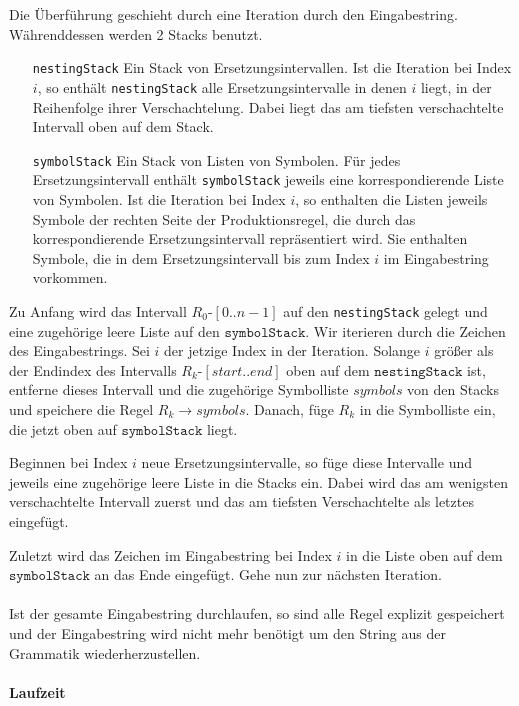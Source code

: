 Die Überführung geschieht durch eine Iteration durch den Eingabestring. Währenddessen werden 2 Stacks benutzt.

\begin{itemize}[leftmargin=2.5cm]
    \item[\texttt{nestingStack}] Ein Stack von Ersetzungsintervallen. Ist die Iteration bei Index $i$, so enthält \texttt{nestingStack} alle Ersetzungsintervalle in denen $i$ liegt, in der Reihenfolge ihrer Verschachtelung. Dabei liegt das am tiefsten verschachtelte Intervall oben auf dem Stack.
    \item[\texttt{symbolStack}] Ein Stack von Listen von Symbolen. Für jedes Ersetzungsintervall enthält \texttt{symbolStack} jeweils eine korrespondierende Liste von Symbolen. 
    Ist die Iteration bei Index $i$, so enthalten die Listen jeweils Symbole der rechten Seite der Produktionsregel, die durch das korrespondierende Ersetzungsintervall repräsentiert wird. Sie enthalten Symbole, die in dem Ersetzungsintervall bis zum Index $i$ im Eingabestring vorkommen. 
\end{itemize} 

Zu Anfang wird das Intervall $R_0$-$[0..n-1]$ auf den \texttt{nestingStack} gelegt und eine zugehörige leere Liste auf den $\texttt{symbolStack}$. 
Wir iterieren durch die Zeichen des Eingabestrings. Sei $i$ der jetzige Index in der Iteration.
Solange $i$ größer als der Endindex des Intervalls $R_k$-$[start..end]$ oben auf dem $\texttt{nestingStack}$ ist, entferne dieses Intervall und die zugehörige Symbolliste $symbols$ von den Stacks und speichere die Regel $R_k \rightarrow symbols$. Danach, füge $R_k$ in die Symbolliste ein, die jetzt oben auf $\texttt{symbolStack}$ liegt.

Beginnen bei Index $i$ neue Ersetzungsintervalle, so füge diese Intervalle und jeweils eine zugehörige leere Liste in die Stacks ein. Dabei wird das am wenigsten verschachtelte Intervall zuerst und das am tiefsten Verschachtelte als letztes eingefügt.

Zuletzt wird das Zeichen im Eingabestring bei Index $i$ in die Liste oben auf dem $\texttt{symbolStack}$ an das Ende eingefügt. Gehe nun zur nächsten Iteration.\\\\

Ist der gesamte Eingabestring durchlaufen, so sind alle Regel explizit gespeichert und der Eingabestring wird nicht mehr benötigt um den String aus der Grammatik wiederherzustellen.

\paragraph{Laufzeit}

